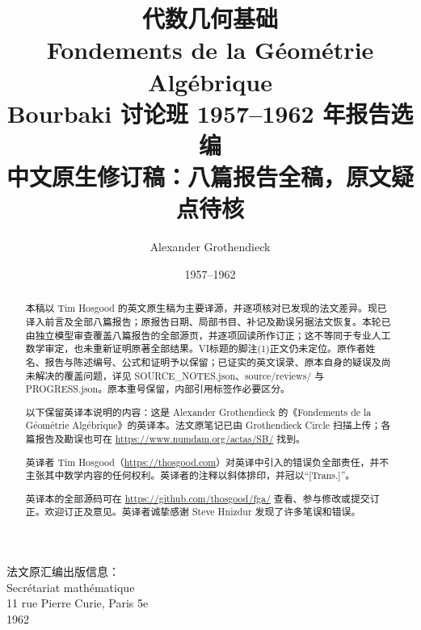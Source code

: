 \documentclass[a4paper,oneside,fleqn]{book}
\title{代数几何基础\\[0.5em]\large Fondements de la Géométrie Algébrique\\[0.5em]\normalsize Bourbaki 讨论班 1957--1962 年报告选编\\[1em]中文原生修订稿：八篇报告全稿，原文疑点待核}
\author{Alexander Grothendieck}
\date{1957--1962}
\begin{document}
\frontmatter
\pagestyle{plain}
\maketitle
\begin{center}
法文原汇编出版信息：\\
Secrétariat mathématique\\
11 rue Pierre Curie, Paris 5e\\
1962
\end{center}
\begin{abstract}
本稿以 Tim Hosgood 的英文原生稿为主要译源，并逐项核对已发现的法文差异。现已译入前言及全部八篇报告；原报告日期、局部书目、补记及勘误另据法文恢复。本轮已由独立模型审查覆盖八篇报告的全部源页，并逐项回读所作订正；这不等同于专业人工数学审定，也未重新证明原著全部结果。VI标题的脚注(1)正文仍未定位。原作者姓名、报告与陈述编号、公式和证明予以保留；已证实的英文误录、原本自身的疑误及尚未解决的覆盖问题，详见 SOURCE\_NOTES.json、source/reviews/ 与 PROGRESS.json。原本重号保留，内部引用标签作必要区分。
\end{abstract}
\begin{abstract}
以下保留英译本说明的内容：这是 Alexander Grothendieck 的《Fondements de la Géométrie Algébrique》的英译本。法文原笔记已由 Grothendieck Circle 扫描上传；各篇报告及勘误也可在 \url{https://www.numdam.org/actas/SB/} 找到。

英译者 Tim Hosgood（\url{https://thosgood.com}）对英译中引入的错误负全部责任，并不主张其中数学内容的任何权利。英译者的注释以斜体排印，并冠以“[Trans.]”。

英译本的全部源码可在 \url{https://github.com/thosgood/fga/} 查看、参与修改或提交订正。欢迎订正及意见。英译者诚挚感谢 Steve Hnizdur 发现了许多笔误和错误。
\end{abstract}
\setcounter{tocdepth}{1}
\tableofcontents
\end{document}
